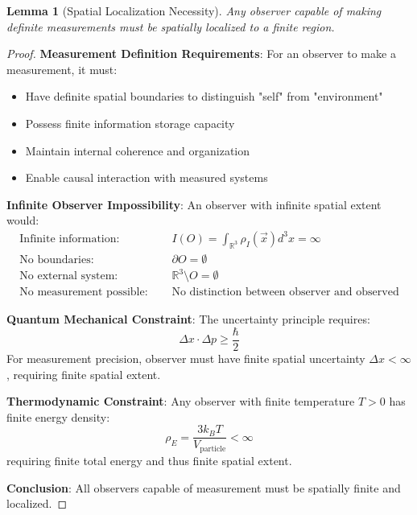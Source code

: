 \documentclass[12pt,a4paper]{article}
\newtheorem{lemma}[theorem]{Lemma}
\begin{document}
\begin{lemma}[Spatial Localization Necessity]
Any observer capable of making definite measurements must be spatially localized to a finite region.
\end{lemma}

\begin{proof}
\textbf{Measurement Definition Requirements}: For an observer to make a measurement, it must:
\begin{itemize}
    \item Have definite spatial boundaries to distinguish "self" from "environment"
    \item Possess finite information storage capacity
    \item Maintain internal coherence and organization
    \item Enable causal interaction with measured systems
\end{itemize}

\textbf{Infinite Observer Impossibility}: An observer with infinite spatial extent would:
\begin{align}
\text{Infinite information: } &\quad I(O) = \int_{\mathbb{R}^3} \rho_I(\vec{x}) d^3x = \infty \\
\text{No boundaries: } &\quad \partial O = \emptyset \\
\text{No external system: } &\quad \mathbb{R}^3 \setminus O = \emptyset \\
\text{No measurement possible: } &\quad \text{No distinction between observer and observed}
\end{align}

\textbf{Quantum Mechanical Constraint}: The uncertainty principle requires:
$$\Delta x \cdot \Delta p \geq \frac{\hbar}{2}$$
For measurement precision, observer must have finite spatial uncertainty $\Delta x < \infty$, requiring finite spatial extent.

\textbf{Thermodynamic Constraint}: Any observer with finite temperature $T > 0$ has finite energy density:
$$\rho_E = \frac{3k_B T}{V_{\text{particle}}} < \infty$$
requiring finite total energy and thus finite spatial extent.

\textbf{Conclusion}: All observers capable of measurement must be spatially finite and localized.
\end{proof}
\end{document}
